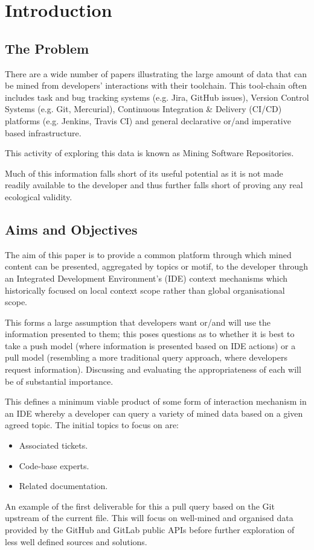 \chapter{Introduction}

\section{The Problem}

\normalfont There are a wide number of papers illustrating the large amount of data that can be mined from developers' interactions with their toolchain. This tool-chain often includes task and bug tracking systems (e.g. Jira, GitHub issues), Version Control Systems (e.g. Git, Mercurial), Continuous Integration \& Delivery (CI/CD) platforms (e.g. Jenkins, Travis CI) and general declarative or/and imperative based infrastructure.

This activity of exploring this data is known as Mining Software Repositories.

Much of this information falls short of its useful potential as it is not made readily available to the developer and thus further falls short of proving any real ecological validity.

\section{Aims and Objectives}

The aim of this paper is to provide a common platform through which mined content can be presented, aggregated by topics or motif, to the developer through an Integrated Development Environment's (IDE) context mechanisms which historically focused on local context scope rather than global organisational scope.

This forms a large assumption that developers want or/and will use the information presented to them; this poses questions as to whether it is best to take a push model (where information is presented based on IDE actions) or a pull model (resembling a more traditional query approach, where developers request information). Discussing and evaluating the appropriateness of each will be of substantial importance. 

This defines a minimum viable product of some form of interaction mechanism in an IDE whereby a developer can query a variety of mined data based on a given agreed topic. The initial topics to focus on are:
\begin{itemize}
	\item Associated tickets.
	\item Code-base experts.
	\item Related documentation.
\end{itemize}

An example of the first deliverable  for this a pull query based on the Git upstream of the current file. This will focus on well-mined and organised data provided by the GitHub and GitLab public APIs before further exploration of less well defined sources and solutions. 